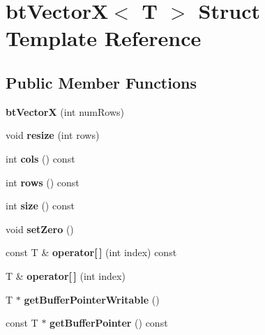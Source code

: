 \hypertarget{structbt_vector_x}{\section{bt\+Vector\+X$<$ T $>$ Struct Template Reference}
\label{structbt_vector_x}
}
\subsection*{Public Member Functions}
\begin{DoxyCompactItemize}
\item 
\hypertarget{structbt_vector_x_a5919baf0daf9dca9c1821ad33b6e2eb3}{{\bfseries bt\+Vector\+X} (int num\+Rows)}\label{structbt_vector_x_a5919baf0daf9dca9c1821ad33b6e2eb3}

\item 
\hypertarget{structbt_vector_x_a604e385e856a599fc2126a7804cfa856}{void {\bfseries resize} (int rows)}\label{structbt_vector_x_a604e385e856a599fc2126a7804cfa856}

\item 
\hypertarget{structbt_vector_x_aae1d9f4f48948e7557c250611aa9e419}{int {\bfseries cols} () const }\label{structbt_vector_x_aae1d9f4f48948e7557c250611aa9e419}

\item 
\hypertarget{structbt_vector_x_aab871e94950da7446347ef6918ed0565}{int {\bfseries rows} () const }\label{structbt_vector_x_aab871e94950da7446347ef6918ed0565}

\item 
\hypertarget{structbt_vector_x_aaa2e8cb1ecae5c26dc4bb185e5a16723}{int {\bfseries size} () const }\label{structbt_vector_x_aaa2e8cb1ecae5c26dc4bb185e5a16723}

\item 
\hypertarget{structbt_vector_x_adcc796091625d29f1e5ebef76753846f}{void {\bfseries set\+Zero} ()}\label{structbt_vector_x_adcc796091625d29f1e5ebef76753846f}

\item 
\hypertarget{structbt_vector_x_a70f18cb15c6167cf88a3254eec5fb0e0}{const T \& {\bfseries operator\mbox{[}$\,$\mbox{]}} (int index) const }\label{structbt_vector_x_a70f18cb15c6167cf88a3254eec5fb0e0}

\item 
\hypertarget{structbt_vector_x_a5b6c10204cdcb48c4124243b979c4dcb}{T \& {\bfseries operator\mbox{[}$\,$\mbox{]}} (int index)}\label{structbt_vector_x_a5b6c10204cdcb48c4124243b979c4dcb}

\item 
\hypertarget{structbt_vector_x_aea4bc1aaef22a96a1090435a7d026b0c}{T $\ast$ {\bfseries get\+Buffer\+Pointer\+Writable} ()}\label{structbt_vector_x_aea4bc1aaef22a96a1090435a7d026b0c}

\item 
\hypertarget{structbt_vector_x_acca03aa5658736a6a6a61fa1c3df6216}{const T $\ast$ {\bfseries get\+Buffer\+Pointer} () const }\label{structbt_vector_x_acca03aa5658736a6a6a61fa1c3df6216}

\end{DoxyCompactItemize}
